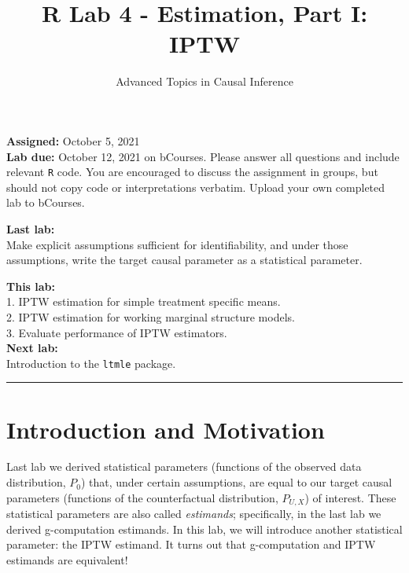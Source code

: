 \documentclass{exam}
\title{R Lab 4 - Estimation, Part I: IPTW}
\author{Advanced Topics in Causal Inference}
\date{}
\begin{document}
\maketitle



\noindent \textbf{Assigned:} October 5, 2021\\
\textbf{Lab due:} October 12, 2021 on bCourses. Please answer all questions and include relevant \texttt{R} code. You are encouraged to discuss the assignment in groups, but should not copy code or interpretations verbatim. Upload your own completed lab to bCourses.

\noindent \textbf{Last lab:} \\
Make explicit assumptions sufficient for identifiability, and under those assumptions, write the target causal parameter as a statistical parameter.


\noindent \textbf{This lab:}\\
1. IPTW estimation for simple treatment specific means. \\
2. IPTW estimation for working marginal structure models. \\
3. Evaluate performance of IPTW estimators. \\

\noindent \textbf{Next lab:}\\
Introduction to the \texttt{ltmle} package.



\begin{center}
\noindent\rule{18cm}{0.4pt}
\end{center}


\section{Introduction and Motivation}

Last lab we derived statistical parameters (functions of the observed data distribution, $P_0$) that, under certain assumptions, are equal to our target causal parameters (functions of the counterfactual distribution, $P_{U,X}$) of interest. These statistical parameters are also called \textit{estimands}; specifically, in the last lab we derived g-computation estimands. In this lab, we will introduce another statistical parameter: the IPTW estimand. It turns out that g-computation and IPTW estimands are equivalent! %
\end{document}
